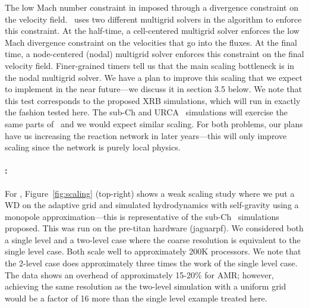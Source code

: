 The low Mach number constraint in imposed through a divergence
constraint on the velocity field.
\maestro\ uses two different multigrid solvers in the algorithm to
enforce this constraint.  At
the half-time, a cell-centered multigrid solver enforces the low Mach
divergence constraint on the velocities that go into the fluxes.  At
the final time, a node-centered (nodal) multigrid solver enforces
this constraint on the final velocity field.
Finer-grained timers tell us that the main scaling bottleneck is in
the nodal multigrid solver.  We have a plan to improve this scaling
that we expect to implement in the near future---we discuss it 
in section 3.5 below.  We note that this test corresponds to the 
proposed XRB simulations, which will run in exactly the fashion
tested here.  The sub-Ch and URCA \maestro\ simulations will exercise the
same parts of \maestro\ and we would expect similar scaling.  For
both problems, our plans have us increasing the reaction network in
later years---this will only improve scaling since the network is purely
local physics.

\paragraph{\castro: }
%
 For \castro, Figure~\ref{fig:scaling} (top-right) shows a  
weak scaling study where we put a WD on the adaptive grid and
simulated hydrodynamics with self-gravity using a monopole
approximation---this is representative of the sub-Ch
\castro\ simulations proposed.  This was run on the pre-titan hardware
(jaguarpf).  We considered both a single level and a two-level case
where the coarse resolution is equivalent to the single level case.
Both scale well to approximately 200K processors.  We note that the
2-level case does approximately three times the work of the single
level case.  The data shows an overhead of approximately 15-20\% for
AMR; however, achieving the same resolution as the two-level
simulation with a uniform grid would be a factor of 16 more than the
single level example treated here.


